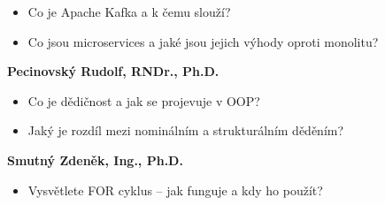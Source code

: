 \begin{profesorbox}
\begin{itemize}
  \item Co je Apache Kafka a k čemu slouží?
  \item Co jsou microservices a jaké jsou jejich výhody oproti monolitu?
\end{itemize}
\textbf{Pecinovský Rudolf, RNDr., Ph.D.}
\begin{itemize}
  \item Co je dědičnost a jak se projevuje v OOP?
  \item Jaký je rozdíl mezi nominálním a strukturálním děděním?
\end{itemize}
\textbf{Smutný Zdeněk, Ing., Ph.D.}
\begin{itemize}
  \item Vysvětlete FOR cyklus -- jak funguje a kdy ho použít?
\end{itemize}
\end{profesorbox}
